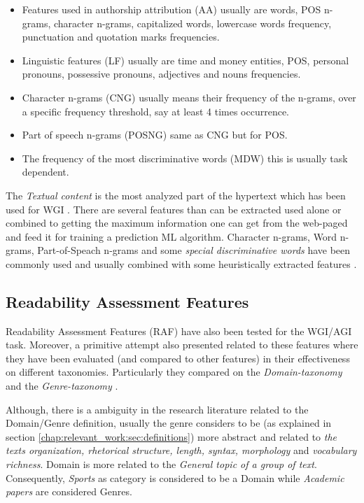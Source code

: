 \begin{itemize}
\item Features used in authorship attribution (AA) usually are words, POS n-grams, character n-grams, capitalized words, lowercase words frequency, punctuation and quotation marks frequencies. 
\item Linguistic features (LF) usually are time and money entities, POS, personal pronouns, possessive pronouns, adjectives and nouns frequencies. 
\item Character n-grams (CNG) usually means their frequency of the n-grams, over a specific frequency threshold, say at least 4 times occurrence. 
\item Part of speech n-grams (POSNG) same as CNG but for POS.
\item The frequency of the most discriminative words (MDW) this is usually task dependent.
\end{itemize}

The \textit{Textual content} is the most analyzed part of the hypertext which has been used for WGI \parencite{mason2009distance,Sharroff2010}. There are several features than can be extracted used alone or combined to getting the maximum information one can get from the web-paged and feed it for training a prediction ML algorithm. Character n-grams, Word n-grams, Part-of-Speach n-grams and some \textit{special discriminative words} have been commonly used and usually combined with some heuristically extracted features \parencite{kanaris2009learning,kumari2014web,levering2008using,Lim2005,mason2009n,onan2018ensemble,petrenz2011stable,sharoff2010web,Nooralahzadeh2014}.

\subsection{Readability Assessment Features}

Readability Assessment Features (RAF) have also been tested for the WGI/AGI task. Moreover, a primitive attempt also presented related to these features where they have been evaluated (and compared to other features) in their effectiveness on different taxonomies. Particularly they compared on the \textit{Domain-taxonomy} and the \textit{Genre-taxonomy} \parencite{falkenjack2016exploratory}.

Although, there is a ambiguity in the research literature related to the Domain/Genre definition, usually the genre considers to be (as explained in section \ref{chap:relevant_work:sec:definitions}) more abstract and related to \textit{the texts organization, rhetorical structure, length, syntax, morphology} and \textit{vocabulary richness}. Domain is more related to the \textit{General topic of a group of text}. Consequently, \textit{Sports} as category is considered to be a Domain while \textit{Academic papers} are considered Genres.

